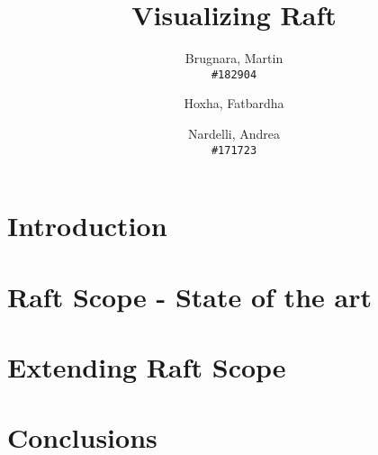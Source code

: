 \documentclass[11pt,a4paper]{proc}
\author{
  Brugnara, Martin\\
  \texttt{\#182904}
  \and
  Hoxha, Fatbardha\\
  \texttt{}
  \and
  Nardelli, Andrea\\
  \texttt{\#171723}
}
\title{Visualizing Raft}
\begin{document}
\maketitle

\abstract{}


\section{Introduction}


\section{Raft Scope - State of the art}


\section{Extending Raft Scope}


\section{Conclusions}




\end{document}
